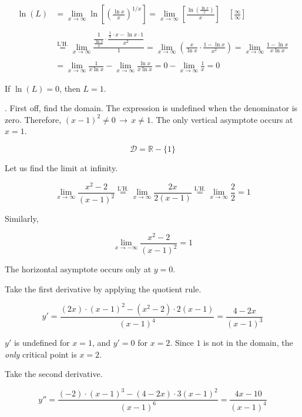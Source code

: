 \documentclass{article}
\begin{document}
\begin{align*}\ln(L)&=\lim_{x\to\infty}\ln\left[\left(\frac{\ln x}x\right)^{1/x}\right]=\lim_{x\to \infty}\left[\frac{\ln\left(\frac{\ln x}x\right)}x\right]\quad\left[\frac\infty\infty\right]\\\\&\overset{\text{L'H.}}{=}\lim_{x\to\infty} \frac{\dfrac1{\frac{\ln x}{x}}\cdot\dfrac{\frac1x\cdot x-\ln x\cdot1}{x^2}}{1}=\lim_{x\to\infty}\left({\frac x{\ln x}\cdot\frac{1-\ln x}{x^2}}\right)=\lim_{x\to\infty}\frac{1-\ln x}{x\ln x}\\\\&=\lim_{x\to\infty}\frac1{x\ln x}-\lim_{x\to\infty}\frac{\ln x}{x\ln x}=0-\lim_{x\to\infty}\frac1x=0\end{align*}

\hfill

\noindent If $\ln(L) = 0$, then $\boxed{L = 1}$.

\hfill

. First off, find the domain. The expression is undefined when the denominator is zero. Therefore, $(x-1)^2\neq0\,\rightarrow\,x\neq1$. The only vertical asymptote occurs at $x = 1$.

\[\mathcal{D}=\mathbb{R}-\{1\}\]

\hfill

\noindent Let us find the limit at infinity.

\[\lim_{x\to \infty}\frac{x^2-2}{(x-1)^2}\overset{\text{L'H.}}{=}\lim_{x\to \infty}\frac{2x}{2(x-1)}\overset{\text{L'H.}}{=}\lim_{x\to\infty}\frac{2}{2}=1\]

\noindent Similarly,

\[\lim_{x\to-\infty}\frac{x^2-2}{(x-1)^2}=1\]

\hfill

\noindent The horizontal asymptote occurs only at $y=0$.

\hfill

\noindent Take the first derivative by applying the quotient rule.

\[y'=\frac{(2x)\cdot(x-1)^2-\left(x^2-2\right)\cdot2(x-1)}{(x-1)^4}=\frac{4-2x}{(x-1)^3}\]

\hfill

\noindent $y'$ is undefined for $x=1$, and $y'=0$ for $x=2$. Since $1$ is not in the domain, the \textit{only} critical point is $x = 2$.

\hfill

\noindent Take the second derivative.

\[y''=\frac{(-2)\cdot(x-1)^3-(4-2x)\cdot3(x-1)^2}{(x-1)^6}=\frac{4x-10}{(x-1)^4}\]
\end{document}
